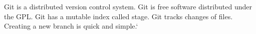 Git is a distributed version control system.
Git is free software distributed under the GPL.
Git has a mutable index called stage.
Git tracks changes of files.
Creating a new branch is quick and simple.`
